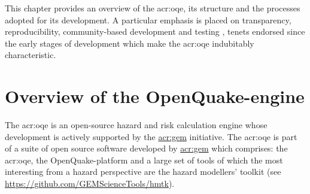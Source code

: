 This chapter provides an overview of the \gls{acr:oqe}, 
its structure and the processes adopted for its development. 
A particular emphasis is placed on transparency, reproducibility,
community-based development and testing \parencite{pagani2014}, 
tenets endorsed since the early stages of development which make
the \gls{acr:oqe} indubitably characteristic. 
%
\section{Overview of the OpenQuake-engine}
%
The \gls{acr:oqe} is an open-source hazard and risk calculation engine 
whose development is actively supported by the 
\href{http://globalquakemodel.org}{\gls{acr:gem}} initiative.
%
The \gls{acr:oqe} is part of a suite of open source software developed by 
\href{http://globalquakemodel.org}{\gls{acr:gem}} which comprises: the 
\gls{acr:oqe}, the OpenQuake-platform and a large set of tools of which 
the most interesting from a hazard perspective are the hazard modellers' 
toolkit (see \href{https://github.com/GEMScienceTools/hmtk}
{https://github.com/GEMScienceTools/hmtk}).

